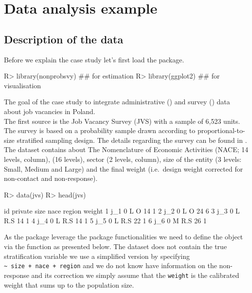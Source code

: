 \documentclass[
]{jss}
\begin{document}
\section{Data analysis example}\label{sec-data-analysis}

\subsection{Description of the data}\label{description-of-the-data}

Before we explain the case study let's first load the package.

\begin{CodeChunk}
\begin{CodeInput}
R> library(nonprobsvy) ## for estimation
R> library(ggplot2) ## for visualisation
\end{CodeInput}
\end{CodeChunk}

The goal of the case study to integrate administrative ()
and survey () data about job vacancies in Poland.\\
The first source is the Job Vacancy Survey (JVS) with a sample of 6,523
units. The survey is based on a probability sample drawn according to
proportional-to-size stratified sampling design. The details regarding
the survey can be found in \cite{jvs2022}. The dataset contains about
The Nomenclature of Economic Activities (NACE; 14 levels, 
column),  (16 levels), sector (2 levels, 
column), size of the entity (3 levels: Small, Medium and Large) and the
final weight (i.e.~design weight corrected for non-contact and
non-response).

\begin{CodeChunk}
\begin{CodeInput}
R> data(jvs)
R> head(jvs)
\end{CodeInput}
\begin{CodeOutput}
   id private size nace region weight
1 j_1       0    L    O     14      1
2 j_2       0    L    O     24      6
3 j_3       0    L  R.S     14      1
4 j_4       0    L  R.S     14      1
5 j_5       0    L  R.S     22      1
6 j_6       0    M  R.S     26      1
\end{CodeOutput}
\end{CodeChunk}

As the package leverage the  package functionalities we need
to define the  object via the  function
as presented below. The dataset does not contain the true stratification
variable we use a simplified version by specifying
\texttt{\textasciitilde{}\ size\ +\ nace\ +\ region} and we do not know
have information on the non-response and its correction we simply assume
that the \texttt{weight} is the calibrated weight that sums up to the
population size.
\end{document}
